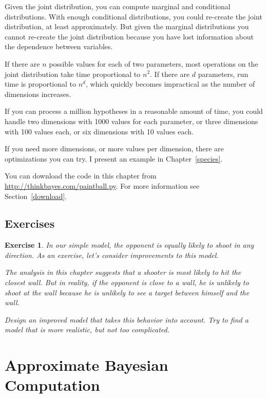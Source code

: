 \documentclass[12pt]{book}
\theoremstyle{exercise}
\newtheorem{exercise}{Exercise}[chapter]
\begin{document}
Given the joint distribution, you can compute marginal and conditional
distributions.  With enough conditional distributions, you could
re-create the joint distribution, at least approximately.  But given
the marginal distributions you cannot re-create the joint distribution
because you have lost information about the dependence between
variables.

If there are $n$ possible values for each of two parameters, most
operations on the joint distribution take time proportional to $n^2$.
If there are $d$ parameters, run time is proportional to $n^d$,
which quickly becomes impractical as the number of dimensions increases.

If you can process a million hypotheses in a reasonable amount of time,
you could handle two dimensions with 1000 values for each parameter,
or three dimensions with 100 values each, or six dimensions with 10
values each.

If you need more dimensions, or more values per dimension, there are
optimizations you can try.  I present an example
in Chapter~\ref{species}.

You can download the code in this chapter from
\url{http://thinkbayes.com/paintball.py}.
  For more information
see Section~\ref{download}.

\section{Exercises}

\begin{exercise}
In our simple model, the opponent is equally likely to shoot in any
direction.  As an exercise, let's consider improvements to this model.

The analysis in this chapter suggests that a shooter is most likely to
hit the closest wall.  But in reality, if the opponent is close to a
wall, he is unlikely to shoot at the wall because he is unlikely to
see a target between himself and the wall.

Design an improved model that takes this behavior
into account.  Try to find a model that is more realistic, but not
too complicated.
\end{exercise}





\chapter{Approximate Bayesian Computation}
\end{document}
